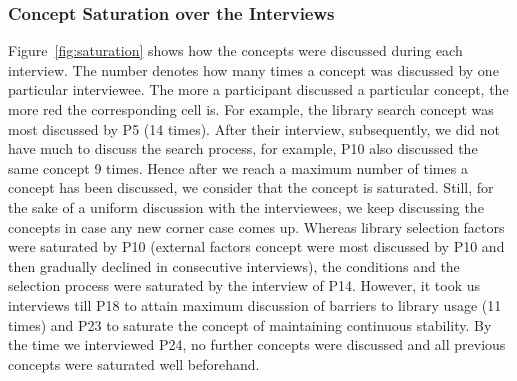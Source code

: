 \subsubsection{Concept Saturation over the Interviews}

Figure~\ref{fig:saturation} shows how the concepts were discussed during each interview. The number denotes how many times a concept was discussed by one particular interviewee. The more a participant discussed a particular concept, the more red the corresponding cell is. For example, the library search concept was most discussed by P5 (14 times). After their interview, subsequently, we did not have much to discuss the search process, for example, P10 also discussed the same concept 9 times. Hence after we reach a maximum number of times a concept has been discussed, we consider that the concept is saturated. Still, for the sake of a uniform discussion with the interviewees, we keep discussing the concepts in case any new corner case comes up. Whereas library selection factors were saturated by P10 (external factors concept were most discussed by P10 and then gradually declined in consecutive interviews), the conditions and the selection process were saturated by the interview of P14. However, it took us interviews till P18 to attain maximum discussion of barriers to library usage (11 times) and P23 to saturate the concept of maintaining continuous stability. By the time we interviewed P24, no further concepts were discussed and all previous concepts were saturated well beforehand. 


